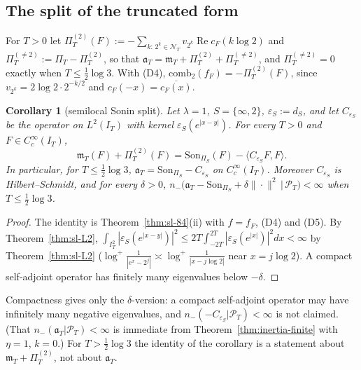 \documentclass[11pt]{amsart}
\newtheorem{corollary}[theorem]{Corollary}
\theoremstyle{definition}
\theoremstyle{remark}
\newcommand{\Rel}{\operatorname{Re}}
\newcommand{\PT}{\mathcal P_T}
\newcommand{\IT}{I_T}
\newcommand{\cF}{c_F}
\newcommand{\NT}{\mathcal N_T}
\newcommand{\PiT}{\Pi_T}
\newcommand{\mT}{\mathfrak m_T}
\begin{document}
\subsection{The split of the truncated form}\label{subsec:sl-split}
{\sloppy For $T>0$ let $\Pi^{(2)}_T(F):=-\sum_{k:\,2^k\in\NT}v_{2^k}\Rel\cF(k\log2)$ and
$\Pi^{(\ne2)}_T:=\PiT-\Pi^{(2)}_T$, so that
$\mathfrak a_T=\mT+\Pi^{(2)}_T+\Pi^{(\ne2)}_T$, and $\Pi^{(\ne2)}_T=0$ exactly when $T\le\frac12\log3$. With (D4),
$\mathrm{comb}_2(f_F)=-\Pi^{(2)}_T(F)$, since $v_{2^k}=2\log2\cdot2^{-k/2}$ and $\cF(-x)=\overline{\cF(x)}$.\par}

\begin{corollary}[semilocal Sonin split]\label{cor:sl-split}
Let $\lambda=1$, $S=\{\infty,2\}$, $\varepsilon_S:=d_S$, and let $C_{\varepsilon_S}$ be the operator on $L^2(\IT)$ with kernel
$\varepsilon_S(e^{|x-y|})$. For every $T>0$ and $F\in C_c^\infty(\IT)$,
\[
\mT(F)+\Pi^{(2)}_T(F)=\mathrm{Son}_{\Pi_S}(F)-\langle C_{\varepsilon_S}F,F\rangle .
\]
In particular, for $T\le\frac12\log3$, $\mathfrak a_T=\mathrm{Son}_{\Pi_S}-C_{\varepsilon_S}$ on $C_c^\infty(\IT)$.
Moreover $C_{\varepsilon_S}$ is Hilbert--Schmidt, and for every $\delta>0$,
$n_-\big(\mathfrak a_T-\mathrm{Son}_{\Pi_S}+\delta\|\cdot\|^2\,\big|\,\PT\big)<\infty$ when $T\le\frac12\log3$.
\end{corollary}
\begin{proof}
The identity is Theorem~\ref{thm:sl-84}(ii) with $f=f_F$, (D4) and (D5). By Theorem~\ref{thm:sl-L2},
$\int_{\IT^2}|\varepsilon_S(e^{|x-y|})|^2\le2T\int_{-2T}^{2T}|\varepsilon_S(e^{|x|})|^2dx<\infty$ by Theorem~\ref{thm:sl-L2}
($\log^+\frac1{|e^x-2^j|}\asymp\log^+\frac1{|x-j\log2|}$ near $x=j\log2$). A compact self-adjoint operator has finitely many eigenvalues below $-\delta$.
\end{proof}
Compactness gives only the $\delta$-version: a compact self-adjoint operator may have infinitely many negative
eigenvalues, and $n_-(-C_{\varepsilon_S}|\PT)<\infty$ is not claimed. (That $n_-(\mathfrak a_T|\PT)<\infty$ is immediate from
Theorem~\ref{thm:inertia-finite} with $\eta=1$, $k=0$.) For $T>\frac12\log3$ the identity of the corollary is a
statement about $\mT+\Pi^{(2)}_T$, not about $\mathfrak a_T$.
\end{document}
